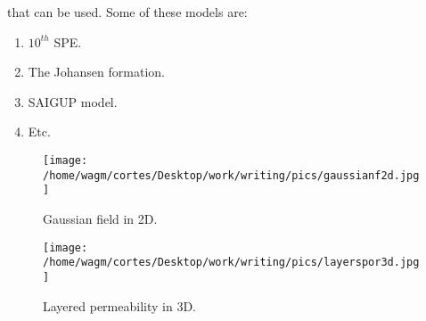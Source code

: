 \documentclass[a4paper,10pt]{report}
\begin{document}
that can be used. Some of these models are:
\begin{enumerate}
 \item $10^{th}$ SPE. 
 \item The Johansen formation.
 \item SAIGUP model.
 \item Etc.
\end{enumerate}
\begin{figure}[ht]
\centering
\begin{minipage}{.6\textwidth}
\texttt{[image: /home/wagm/cortes/Desktop/work/writing/pics/gaussianf2d.jpg]}
\caption{Gaussian field in 2D.}
\label{fig:Gaussf2D}
\end{minipage}%
\begin{minipage}{.5\textwidth}
\centering
\texttt{[image: /home/wagm/cortes/Desktop/work/writing/pics/layerspor3d.jpg]}
\caption{Layered permeability in 3D.}
\label{fig:layperm3D}
\end{minipage}
\end{figure}
\end{document}
